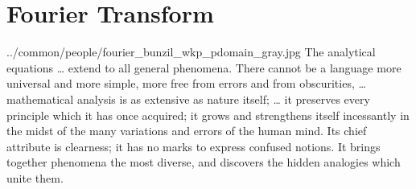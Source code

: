
\chapter{Fourier Transform}
\label{app:fourier}
  {../common/people/fourier_bunzil_wkp_pdomain_gray.jpg}
  {%
  The analytical equations
  \ldots
  extend to all general phenomena. 
  There cannot be a language more universal and more simple, 
  more free from errors and from obscurities, 
  \ldots
  mathematical analysis is as extensive as nature itself; 
  \ldots
  it preserves every principle which it has once acquired; 
  it grows and strengthens itself incessantly in the midst of the many variations and errors of the human mind. 
  Its chief attribute is clearness; it has no marks to express confused notions. 
  It brings together phenomena the most diverse, and discovers the hidden analogies which unite them.
  }

